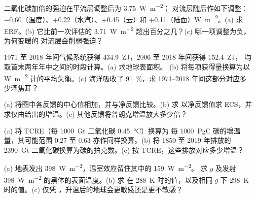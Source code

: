 \begin{exercise}[$\star$]\label{exo:b2:anthropogenic-climate-change:1}
二氧化碳加倍的强迫在平流层调整后为 \qty{3.75}{W.m^{-2}}；
对流层随后作如下调整：$-0.60$（温度）、+0.22（水汽）、+0.45（云）和
+0.11（陆面）\unit{W.m^{-2}}。(a) 求 ERF。(b) 它比前一次评估的
\qty{3.71}{W.m^{-2}} 超出百分之几？(c) 哪一项调整为负，为何变暖的
对流层会削弱强迫？
\end{exercise}

\begin{exercise}[$\star$]\label{exo:b2:anthropogenic-climate-change:2}
1971 至 2018 年间气候系统获得 \qty{434.9}{ZJ}，2006 至 2018 年间获得 \qty{152.4}{ZJ}，
均取首末两年年中之间的时段计算。(a) 求地球表面积。
(b) 将每项获得量换算为以 \unit{W.m^{-2}} 计的平均失衡。(c) 海洋吸收了
\qty{91}{\percent}，求 1971--2018 年间这部分对应多少泽焦耳？
\end{exercise}

\begin{exercise}[$\star$]\label{exo:b2:anthropogenic-climate-change:3}
(a) 将图中各反馈的中心值相加，并与净反馈比较。(b) 求
以净反馈值求 ECS，并求仅由给出的增温。(c)
其他反馈将普朗克增温放大多少倍？
\end{exercise}

\begin{exercise}[$\star$]\label{exo:b2:anthropogenic-climate-change:4}
(a) 将 TCRE（每 \qty{1000}{Gt} 二氧化碳 \qty{0.45}{\celsius}）换算为
每 \qty{1000}{PgC} 碳的增温量，其可能范围 0.27 至 0.63 亦作同样换算。(b) 将
1850 至 2019 年排放的 \qty{2390}{Gt} 二氧化碳换算为碳的拍克数。(c)
按 TCRE，这些排放对应多少增温？
\end{exercise}

\begin{exercise}[$\star\star$]\label{exo:b2:anthropogenic-climate-change:5}
(a) 地表发出 \qty{398}{W.m^{-2}}，温室效应留住其中的 \qty{159}{W.m^{-2}}。
求 $g$ 及发射 \qty{398}{W.m^{-2}} 的黑体的表面温度。(b) 求
在 \qty{288}{K} 时的值，以及相同 $g$ 下 \qty{298}{K} 时的值。(c) 仅凭
，升温后的地球会更敏感还是更不敏感？
\end{exercise}

